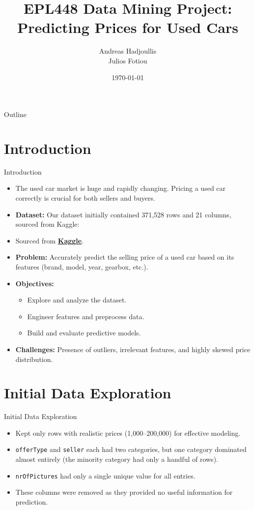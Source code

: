 \documentclass{beamer}
\title{EPL448 Data Mining Project: Predicting Prices for Used Cars}
\author{Andreas Hadjoullis\\Julios Fotiou}
\institute{Department of Computer Science \\ University of Cyprus}
\date{\today}
\begin{document}
\begin{frame}
    \titlepage
\end{frame}

\begin{frame}{Outline}
    \tableofcontents
\end{frame}

\section{Introduction}
\begin{frame}{Introduction}
    \begin{itemize}
        \item The used car market is huge and rapidly changing. Pricing a used car correctly is crucial for both sellers and buyers.
        \item \textbf{Dataset:} Our dataset initially contained 371,528 rows and 21 columns, sourced from Kaggle: 
        \item Sourced from \href{https://www.kaggle.com/datasets/thedevastator/uncovering-factors-that-affect-used-car-prices/data}{\textbf{Kaggle}}.
        \item \textbf{Problem:} Accurately predict the selling price of a used car based on its features (brand, model, year, gearbox, etc.).
        \item \textbf{Objectives:}
            \begin{itemize}
                \item Explore and analyze the dataset.
                \item Engineer features and preprocess data.
                \item Build and evaluate predictive models.
            \end{itemize}
        \item \textbf{Challenges:} Presence of outliers, irrelevant features, and highly skewed price distribution.
    \end{itemize}
\end{frame}

\section{Initial Data Exploration}
\begin{frame}{Initial Data Exploration}
    \begin{itemize}
        \item Kept only rows with realistic prices (1,000–200,000) for effective modeling.
        \item \texttt{offerType} and \texttt{seller} each had two categories, but one category dominated almost entirely (the minority category had only a handful of rows).
        \item \texttt{nrOfPictures} had only a single unique value for all entries.
        \item These columns were removed as they provided no useful information for prediction.
    \end{itemize}
\end{frame}
\end{document}
